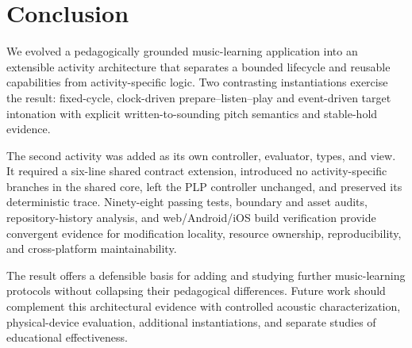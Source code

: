 \documentclass[runningheads]{llncs}
\begin{document}
\section{Conclusion}\label{sec:Conclusions}

We evolved a pedagogically grounded music-learning application into an
extensible activity architecture that separates a bounded lifecycle and
reusable capabilities from activity-specific logic. Two contrasting
instantiations exercise the result: fixed-cycle, clock-driven
prepare--listen--play and event-driven target intonation with explicit
written-to-sounding pitch semantics and stable-hold evidence.

The second activity was added as its own controller, evaluator, types, and
view. It required a six-line shared contract extension, introduced no
activity-specific branches in the shared core, left the PLP controller
unchanged, and preserved its deterministic trace. Ninety-eight passing tests,
boundary and asset audits, repository-history analysis, and web/Android/iOS
build verification provide convergent evidence for modification locality,
resource ownership, reproducibility, and cross-platform maintainability.

The result offers a defensible basis for adding and studying further
music-learning protocols without collapsing their pedagogical differences.
Future work should complement this architectural evidence with controlled
acoustic characterization, physical-device evaluation, additional
instantiations, and separate studies of educational effectiveness.
\end{document}
